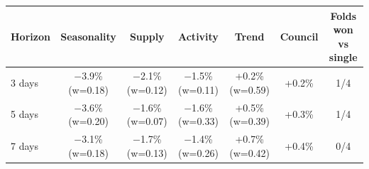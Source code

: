 \renewcommand{\arraystretch}{1.25}
\footnotesize
\begin{tabular}{|l|c|c|c|c|c|c|}
\hline
\textbf{Horizon} & \textbf{Seasonality} & \textbf{Supply} & \textbf{Activity} & \textbf{Trend} & \textbf{Council} & \textbf{Folds won vs single} \\
\hline
3 days & $-$3.9\% (w=0.18) & $-$2.1\% (w=0.12) & $-$1.5\% (w=0.11) & +0.2\% (w=0.59) & +0.2\% & 1/4 \\
\hline
5 days & $-$3.6\% (w=0.20) & $-$1.6\% (w=0.07) & $-$1.6\% (w=0.33) & +0.5\% (w=0.39) & +0.3\% & 1/4 \\
\hline
7 days & $-$3.1\% (w=0.18) & $-$1.7\% (w=0.13) & $-$1.4\% (w=0.26) & +0.7\% (w=0.42) & +0.4\% & 0/4 \\
\hline
\end{tabular}
